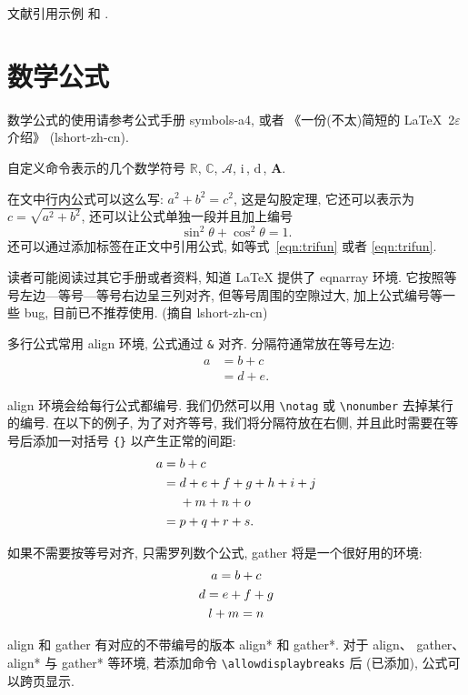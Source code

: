 \documentclass[openany,twoside,12pt]{book}
\theoremstyle{plain}
\newcommand{\CC}{\ensuremath{\mathbb{C}}}
\newcommand{\RR}{\ensuremath{\mathbb{R}}}
\newcommand{\A}{\mathcal{A}}
\newcommand{\ii}{\bm{\mathrm{i}}\,}  %
\newcommand{\md}{\mathrm{d}\,}
\newcommand{\bA}{\boldsymbol{A}}
\begin{document}
文献引用示例 \cite{LiLiu1997} 和 \cite{Adams2003,Shen1994}.


\section{数学公式}

数学公式的使用请参考公式手册 symbols-a4, 或者 《一份(不太)简短的 \LaTeX~2$\varepsilon$ 介绍》 (lshort-zh-cn).

自定义命令表示的几个数学符号 $\RR$, $\CC$, $\A$, $\ii$, $\md$, $\bA$.

在文中行内公式可以这么写: $a^2+b^2=c^2$, 这是勾股定理, 它还可以表示为 $c=\sqrt{a^2+b^2}$, 还可以让公式单独一段并且加上编号
\begin{equation}\label{eqn:trifun}
\sin^2{\theta}+\cos^2{\theta}=1.
\end{equation}
还可以通过添加标签在正文中引用公式, 如等式~\eqref{eqn:trifun} 或者 \ref{eqn:trifun}.

读者可能阅读过其它手册或者资料, 知道 LaTeX 提供了 eqnarray 环境. 它按照等号左边—等号—等号右边呈三列对齐, 但等号周围的空隙过大, 加上公式编号等一些 bug, 目前已不推荐使用. (摘自 lshort-zh-cn)

多行公式常用 align 环境, 公式通过 \verb|&| 对齐. 分隔符通常放在等号左边:
\begin{align}
a & = b + c \\
& = d + e.
\end{align}

align 环境会给每行公式都编号. 我们仍然可以用 \verb|\notag| 或 \verb|\nonumber| 去掉某行的编号. 在以下的例子,
为了对齐等号, 我们将分隔符放在右侧, 并且此时需要在等号后添加一对括号 \verb|{}| 以产生正常的间距:
\begin{align}
a ={} & b + c \\
={} & d + e + f + g + h + i + j \notag \\
& + m + n + o \\
={} & p + q + r + s.
\end{align}

如果不需要按等号对齐, 只需罗列数个公式, gather 将是一个很好用的环境:
\begin{gather}
a = b + c \\
d = e + f + g \notag \\
l + m = n
\end{gather}

align 和 gather 有对应的不带编号的版本 align* 和 gather*.
对于 align、 gather、align* 与 gather* 等环境, 若添加命令 \verb|\allowdisplaybreaks| 后 (已添加), 公式可以跨页显示.
\end{document}
